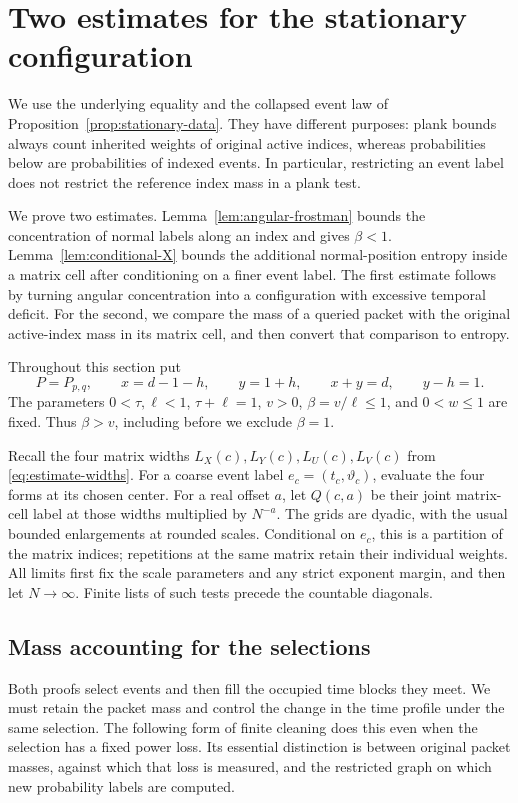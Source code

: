\section{Two estimates for the stationary configuration}
\label{sec:stationary-estimates}

We use the underlying equality and the collapsed event law of
Proposition~\ref{prop:stationary-data}. They have different purposes:
plank bounds always count inherited weights of original active indices,
whereas probabilities below are probabilities of indexed events. In
particular, restricting an event label does not restrict the reference
index mass in a plank test.

We prove two estimates. Lemma~\ref{lem:angular-frostman} bounds the
concentration of normal labels along an index and gives $\beta<1$.
Lemma~\ref{lem:conditional-X} bounds the additional normal-position
entropy inside a matrix cell after conditioning on a finer event label.
The first estimate follows by turning angular concentration into a
configuration with excessive temporal deficit. For the second, we
compare the mass of a queried packet with the original active-index
mass in its matrix cell, and then convert that comparison to entropy.

Throughout this section put
\[
 P=P_{p,q},\qquad x=d-1-h,\qquad y=1+h,
 \qquad x+y=d,\qquad y-h=1.
\]
The parameters $0<\tau,\ell<1$, $\tau+\ell=1$, $v>0$,
$\beta=v/\ell\le1$, and $0<w\le1$ are fixed. Thus
$\beta>v$, including before we exclude $\beta=1$.

Recall the four matrix widths $L_X(c),L_Y(c),L_U(c),L_V(c)$ from
\eqref{eq:estimate-widths}. For a coarse event label
$e_c=(t_c,\vartheta_c)$, evaluate the four forms at its chosen center.
For a real offset $a$, let $Q(c,a)$ be their joint matrix-cell label
at those widths multiplied by $N^{-a}$. The grids are dyadic, with the usual
bounded enlargements at rounded scales. Conditional on $e_c$, this is
a partition of the matrix indices; repetitions at the same matrix
retain their individual weights. All limits first fix the scale
parameters and any strict exponent margin, and then let $N\to\infty$.
Finite lists of such tests precede the countable diagonals.

\subsection{Mass accounting for the selections}

Both proofs select events and then fill the occupied time blocks they
meet. We must retain the packet mass and control the change in the time
profile under the same selection. The following form of finite cleaning
does this even when the selection has a fixed power loss. Its essential
distinction is between original packet masses, against which that loss
is measured, and the restricted graph on which new probability labels
are computed.

